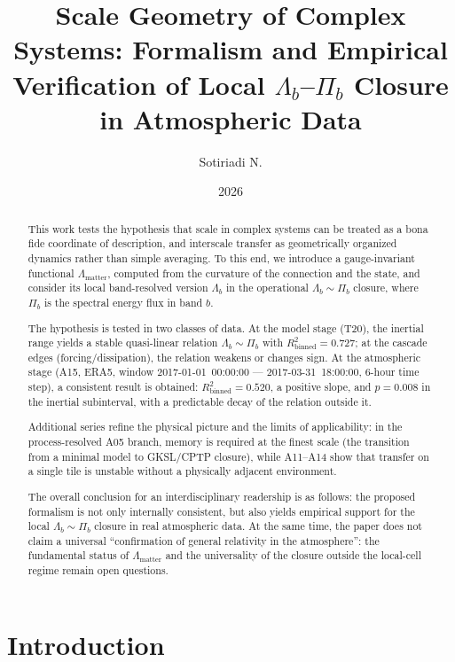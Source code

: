 \documentclass[11pt,a4paper]{article}
\title{Scale Geometry of Complex Systems: Formalism and Empirical Verification of Local \texorpdfstring{$\Lambda_b$--$\Pi_b$}{Lambda_b-Pi_b} Closure in Atmospheric Data}
\author{Sotiriadi N.}
\date{2026}
\theoremstyle{definition}
\theoremstyle{plain}
\theoremstyle{remark}
\begin{document}
\maketitle

\begin{abstract}
This work tests the hypothesis that scale in complex systems can be treated as a bona fide coordinate of description, and interscale transfer as geometrically organized dynamics rather than simple averaging. To this end, we introduce a gauge-invariant functional \(\Lambda_{\mathrm{matter}}\), computed from the curvature of the connection and the state, and consider its local band-resolved version \(\Lambda_b\) in the operational \(\Lambda_b\sim\Pi_b\) closure, where \(\Pi_b\) is the spectral energy flux in band \(b\).

The hypothesis is tested in two classes of data. At the model stage (T20), the inertial range yields a stable quasi-linear relation \(\Lambda_b\sim\Pi_b\) with \(R^2_{\mathrm{binned}}=0.727\); at the cascade edges (forcing/dissipation), the relation weakens or changes sign. At the atmospheric stage (A15, ERA5, window 2017-01-01~00:00:00 --- 2017-03-31~18:00:00, 6-hour time step), a consistent result is obtained: \(R^2_{\mathrm{binned}}=0.520\), a positive slope, and \(p=0.008\) in the inertial subinterval, with a predictable decay of the relation outside it.

Additional series refine the physical picture and the limits of applicability: in the process-resolved A05 branch, memory is required at the finest scale (the transition from a minimal model to GKSL/CPTP closure), while A11--A14 show that transfer on a single tile is unstable without a physically adjacent environment.

The overall conclusion for an interdisciplinary readership is as follows: the proposed formalism is not only internally consistent, but also yields empirical support for the local \(\Lambda_b\sim\Pi_b\) closure in real atmospheric data. At the same time, the paper does not claim a universal ``confirmation of general relativity in the atmosphere'': the fundamental status of \(\Lambda_{\mathrm{matter}}\) and the universality of the closure outside the local-cell regime remain open questions.
\end{abstract}
\newpage

\tableofcontents

\newpage
\section{Introduction}
\label{sec:intro}
\end{document}

